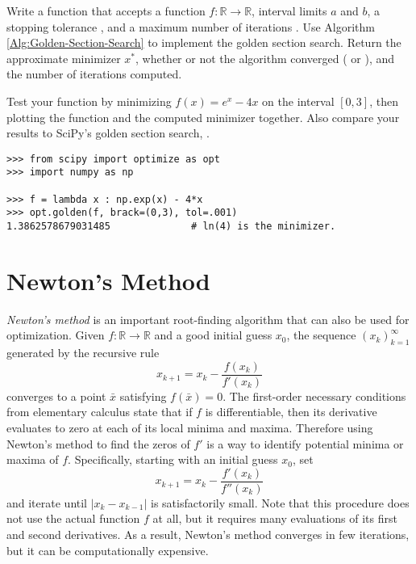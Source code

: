 \begin{problem} %
Write a function that accepts a function $f:\mathbb{R}\rightarrow\mathbb{R}$, interval limits $a$ and $b$, a stopping tolerance , and a maximum number of iterations .
Use Algorithm \ref{Alg:Golden-Section-Search} to implement the golden section search.
Return the approximate minimizer $x^*$, whether or not the algorithm converged ( or ), and the number of iterations computed.

Test your function by minimizing $f(x) = e^x - 4x$ on the interval $[0, 3]$, then plotting the function and the computed minimizer together.
Also compare your results to SciPy's golden section search, .

\begin{lstlisting}
>>> from scipy import optimize as opt
>>> import numpy as np

>>> f = lambda x : np.exp(x) - 4*x
>>> opt.golden(f, brack=(0,3), tol=.001)
1.3862578679031485              # ln(4) is the minimizer.
\end{lstlisting}
\label{prob:golden-section-search}
\end{problem}

\section*{Newton's Method} %

\emph{Newton's method} is an important root-finding algorithm that can also be used for optimization.
Given $f:\mathbb{R}\rightarrow\mathbb{R}$ and a good initial guess $x_0$, the sequence $(x_k)_{k=1}^\infty$ generated by the recursive rule
\[
x_{k+1} = x_k - \frac{f(x_k)}{f'(x_k)}
\]
converges to a point $\bar{x}$ satisfying $f(\bar{x}) = 0$.
The first-order necessary conditions from elementary calculus state that if $f$ is differentiable, then its derivative evaluates to zero at each of its local minima and maxima.
Therefore using Newton's method to find the zeros of $f'$ is a way to identify potential minima or maxima of $f$.
Specifically, starting with an initial guess $x_0$, set
\begin{equation}
x_{k+1} = x_k - \frac{f'(x_k)}{f''(x_k)}
\label{eq:1dopt-newton}
\end{equation}
and iterate until $|x_k - x_{k-1}|$ is satisfactorily small.
Note that this procedure does not use the actual function $f$ at all, but it requires many evaluations of its first and second derivatives.
As a result, Newton's method converges in few iterations, but it can be computationally expensive.


